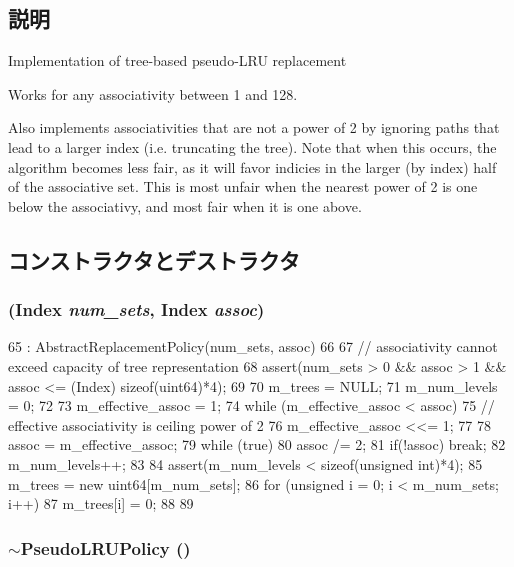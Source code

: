 \subsection{説明}
Implementation of tree-\/based pseudo-\/LRU replacement

Works for any associativity between 1 and 128.

Also implements associativities that are not a power of 2 by ignoring paths that lead to a larger index (i.e. truncating the tree). Note that when this occurs, the algorithm becomes less fair, as it will favor indicies in the larger (by index) half of the associative set. This is most unfair when the nearest power of 2 is one below the associativy, and most fair when it is one above. 

\subsection{コンストラクタとデストラクタ}
\hypertarget{classPseudoLRUPolicy_a586be6f6d9e79f655d6166c91088204d}{
\subsubsection[{PseudoLRUPolicy}]{ ({\bf Index} {\em num\_\-sets}, \/  {\bf Index} {\em assoc})}}
\label{classPseudoLRUPolicy_a586be6f6d9e79f655d6166c91088204d}



\begin{DoxyCode}
65     : AbstractReplacementPolicy(num_sets, assoc)
66 {
67     // associativity cannot exceed capacity of tree representation
68     assert(num_sets > 0 && assoc > 1 && assoc <= (Index) sizeof(uint64)*4);
69 
70     m_trees = NULL;
71     m_num_levels = 0;
72 
73     m_effective_assoc = 1;
74     while (m_effective_assoc < assoc) {
75         // effective associativity is ceiling power of 2
76         m_effective_assoc <<= 1;
77     }
78     assoc = m_effective_assoc;
79     while (true) {
80         assoc /= 2;
81         if(!assoc) break;
82         m_num_levels++;
83     }
84     assert(m_num_levels < sizeof(unsigned int)*4);
85     m_trees = new uint64[m_num_sets];
86     for (unsigned i = 0; i < m_num_sets; i++) {
87         m_trees[i] = 0;
88     }
89 }
\end{DoxyCode}
\hypertarget{classPseudoLRUPolicy_a46c39a4b2f695e5fdc2d31a75e579d98}{
\subsubsection[{$\sim$PseudoLRUPolicy}]{\setlength{\rightskip}{0pt plus 5cm}$\sim${\bf PseudoLRUPolicy} ()}}
\label{classPseudoLRUPolicy_a46c39a4b2f695e5fdc2d31a75e579d98}




